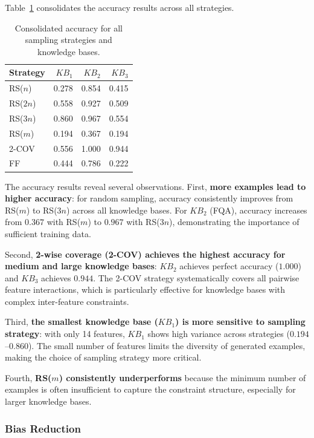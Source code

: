 Table~\ref{tab:accuracy_all} consolidates the accuracy results across all strategies.

\begin{table}[htbp]
\centering
\caption{Consolidated accuracy for all sampling strategies and knowledge bases.}
\label{tab:accuracy_all}
\begin{tabular}{lrrr}
\toprule
Strategy & $KB_1$ & $KB_2$ & $KB_3$ \\
\midrule
RS($n$)  & 0.278 & 0.854 & 0.415 \\
RS($2n$) & 0.558 & 0.927 & 0.509 \\
RS($3n$) & 0.860 & 0.967 & 0.554 \\
RS($m$)  & 0.194 & 0.367 & 0.194 \\
2-COV    & 0.556 & 1.000 & 0.944 \\
FF       & 0.444 & 0.786 & 0.222 \\
\bottomrule
\end{tabular}
\end{table}

The accuracy results reveal several observations.
First, \textbf{more examples lead to higher accuracy}: for random sampling, accuracy consistently improves from RS($m$) to RS($3n$) across all knowledge bases. For $KB_2$ (FQA), accuracy increases from $0.367$ with RS($m$) to $0.967$ with RS($3n$), demonstrating the importance of sufficient training data.

Second, \textbf{2-wise coverage (2-COV) achieves the highest accuracy for medium and large knowledge bases}: $KB_2$ achieves perfect accuracy ($1.000$) and $KB_3$ achieves $0.944$. The 2-COV strategy systematically covers all pairwise feature interactions, which is particularly effective for knowledge bases with complex inter-feature constraints.

Third, \textbf{the smallest knowledge base ($KB_1$) is more sensitive to sampling strategy}: with only 14 features, $KB_1$ shows high variance across strategies ($0.194$--$0.860$). The small number of features limits the diversity of generated examples, making the choice of sampling strategy more critical.

Fourth, \textbf{RS($m$) consistently underperforms} because the minimum number of examples is often insufficient to capture the constraint structure, especially for larger knowledge bases.


\subsubsection{Bias Reduction}

